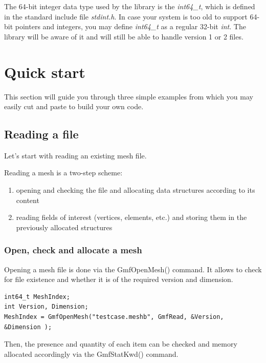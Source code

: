 \documentclass[a4paper,12pt]{article}
\begin{document}
The 64-bit integer data type used by the library is the \emph{int64\_t}, which is defined in the standard include file \emph{stdint.h}. In case your system is too old to support 64-bit pointers and integers, you may define \emph{int64\_t} as a regular 32-bit \emph{int}. The library will be aware of it and will still be able to handle version 1 or 2 files.


%
%

\section{Quick start}

This section will guide you through three simple examples from which you may easily cut and paste to build your own code.

\subsection{Reading a file}

Let's start with reading an existing mesh file.

Reading a mesh is a two-step scheme:

\begin{enumerate}
\item opening and checking the file and allocating data structures according to its content
\item reading fields of interest (vertices, elements, etc.) and storing them in the previously allocated structures
\end{enumerate}

\subsubsection{Open, check and allocate a mesh}

Opening a mesh file is done via the GmfOpenMesh() command. It allows to check for file existence and whether it is of the required version and dimension.

\begin{tt}
\begin{verbatim}
int64_t MeshIndex;
int Version, Dimension;
MeshIndex = GmfOpenMesh("testcase.meshb", GmfRead, &Version, &Dimension );
\end{verbatim}
\end{tt}
\normalfont

Then, the presence and quantity of each item can be checked and memory allocated accordingly via the GmfStatKwd() command.
\end{document}
